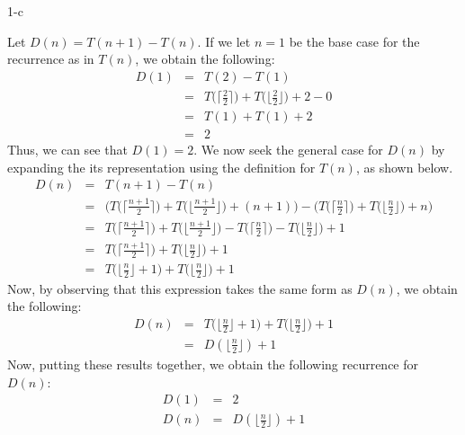 \documentclass[11pt]{article}
\begin{document}
\begin{prob}{1-c}

\end{prob}
\begin{sol}

Let $D(n) = T(n+1) - T(n)$. If we let $n = 1$ be the base case for the recurrence as in $T(n)$, we obtain the following:
\begin{eqnarray*}
D(1) & = & T(2) - T(1) \\
& = &  T\Big(\Big\lceil\frac{2}{2}\Big\rceil\Big) + T\Big(\Big\lfloor\frac{2}{2}\Big\rfloor\Big) + 2 - 0 \\
& = & T(1) + T(1) + 2 \\
& = & 2
\end{eqnarray*}
Thus, we can see that $D(1) = 2$. We now seek the general case for $D(n)$ by expanding the its representation using the definition for $T(n)$, as shown below.
\begin{eqnarray*}
D(n) & = & T(n+1) - T(n) \\
& = & \Bigg(T\Big(\Big\lceil\frac{n+1}{2}\Big\rceil\Big) + T\Big(\Big\lfloor\frac{n+1}{2}\Big\rfloor\Big) + (n+1)\Bigg) - \Bigg(T\Big(\Big\lceil\frac{n}{2}\Big\rceil\Big) + T\Big(\Big\lfloor\frac{n}{2}\Big\rfloor\Big) + n\Bigg) \\
& = & T\Big(\Big\lceil\frac{n+1}{2}\Big\rceil\Big) + T\Big(\Big\lfloor\frac{n+1}{2}\Big\rfloor\Big) - T\Big(\Big\lceil\frac{n}{2}\Big\rceil\Big) - T\Big(\Big\lfloor\frac{n}{2}\Big\rfloor\Big) + 1 \\
& = & T\Big(\Big\lceil\frac{n+1}{2}\Big\rceil\Big) + T\Big(\Big\lfloor\frac{n}{2}\Big\rfloor\Big) + 1 \\
& = & T\Big(\Big\lfloor\frac{n}{2}\Big\rfloor + 1\Big) + T\Big(\Big\lfloor\frac{n}{2}\Big\rfloor\Big) + 1
\end{eqnarray*}
Now, by observing that this expression takes the same form as $D(n)$, we obtain the following:
\begin{eqnarray*}
D(n) & = & T\Big(\Big\lfloor\frac{n}{2}\Big\rfloor + 1\Big) + T\Big(\Big\lfloor\frac{n}{2}\Big\rfloor\Big) + 1 \\
& = & D(\Big\lfloor\frac{n}{2}\Big\rfloor) + 1
\end{eqnarray*}
Now, putting these results together, we obtain the following recurrence for $D(n)$:
\begin{eqnarray*}
D(1) & = & 2 \\
D(n) & = & D(\Big\lfloor\frac{n}{2}\Big\rfloor) + 1
\end{eqnarray*}
\end{sol}
\end{document}
